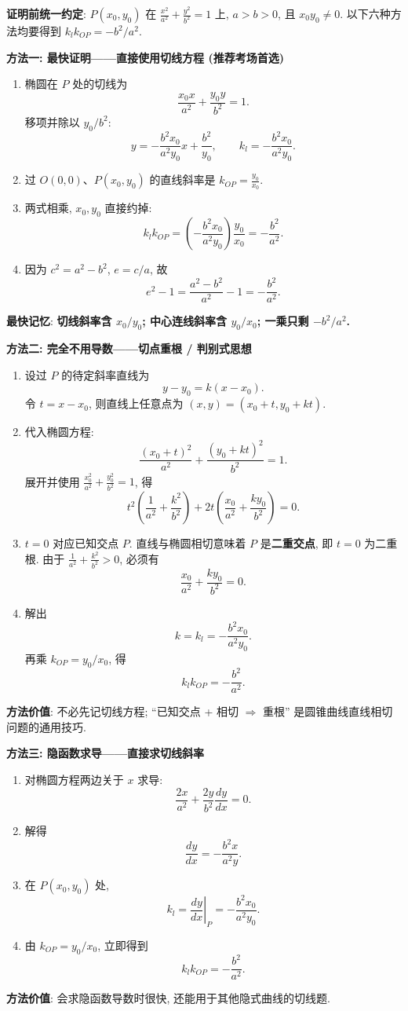 \begin{proofbox}
\textbf{证明前统一约定}: $P(x_0,y_0)$ 在
$\frac{x^2}{a^2}+\frac{y^2}{b^2}=1$ 上, $a>b>0$, 且 $x_0y_0\ne0$.
以下六种方法均要得到 $k_lk_{OP}=-b^2/a^2$.

\textbf{方法一: 最快证明——直接使用切线方程 (推荐考场首选)}

\begin{enumerate}
  \item 椭圆在 $P$ 处的切线为
  \[
  \frac{x_0x}{a^2}+\frac{y_0y}{b^2}=1.
  \]
  移项并除以 $y_0/b^2$:
  \[
  y=-\frac{b^2x_0}{a^2y_0}x+\frac{b^2}{y_0},
  \qquad k_l=-\frac{b^2x_0}{a^2y_0}.
  \]
  \item 过 $O(0,0)$、$P(x_0,y_0)$ 的直线斜率是
  $k_{OP}=\frac{y_0}{x_0}$.
  \item 两式相乘, $x_0,y_0$ 直接约掉:
  \[
  \boxed{k_lk_{OP}=
  \left(-\frac{b^2x_0}{a^2y_0}\right)
  \frac{y_0}{x_0}=-\frac{b^2}{a^2}.}
  \]
  \item 因为 $c^2=a^2-b^2$, $e=c/a$, 故
  \[
  e^2-1=\frac{a^2-b^2}{a^2}-1=-\frac{b^2}{a^2}.
  \]
\end{enumerate}
\textbf{最快记忆}: \textbf{切线斜率含 $x_0/y_0$; 中心连线斜率含 $y_0/x_0$;
一乘只剩 $-b^2/a^2$.}

\textbf{方法二: 完全不用导数——切点重根 / 判别式思想}

\begin{enumerate}
  \item 设过 $P$ 的待定斜率直线为
  \[
  y-y_0=k(x-x_0).
  \]
  令 $t=x-x_0$, 则直线上任意点为
  $(x,y)=(x_0+t,y_0+kt)$.
  \item 代入椭圆方程:
  \[
  \frac{(x_0+t)^2}{a^2}+
  \frac{(y_0+kt)^2}{b^2}=1.
  \]
  展开并使用 $\frac{x_0^2}{a^2}+\frac{y_0^2}{b^2}=1$, 得
  \[
  t^2\left(\frac1{a^2}+\frac{k^2}{b^2}\right)
  +2t\left(\frac{x_0}{a^2}+\frac{ky_0}{b^2}\right)=0.
  \]
  \item $t=0$ 对应已知交点 $P$. 直线与椭圆相切意味着
  $P$ 是\textbf{二重交点}, 即 $t=0$ 为二重根.
  由于 $\frac1{a^2}+\frac{k^2}{b^2}>0$, 必须有
  \[
  \frac{x_0}{a^2}+\frac{ky_0}{b^2}=0.
  \]
  \item 解出
  \[
  k=k_l=-\frac{b^2x_0}{a^2y_0}.
  \]
  再乘 $k_{OP}=y_0/x_0$, 得
  \[
  \boxed{k_lk_{OP}=-\frac{b^2}{a^2}.}
  \]
\end{enumerate}
\textbf{方法价值}: 不必先记切线方程; “已知交点 + 相切 $\Rightarrow$ 重根”
是圆锥曲线直线相切问题的通用技巧.

\textbf{方法三: 隐函数求导——直接求切线斜率}

\begin{enumerate}
  \item 对椭圆方程两边关于 $x$ 求导:
  \[
  \frac{2x}{a^2}+\frac{2y}{b^2}\frac{dy}{dx}=0.
  \]
  \item 解得
  \[
  \frac{dy}{dx}=-\frac{b^2x}{a^2y}.
  \]
  \item 在 $P(x_0,y_0)$ 处,
  \[
  k_l=\left.\frac{dy}{dx}\right|_P
  =-\frac{b^2x_0}{a^2y_0}.
  \]
  \item 由 $k_{OP}=y_0/x_0$, 立即得到
  \[
  \boxed{k_lk_{OP}=-\frac{b^2}{a^2}.}
  \]
\end{enumerate}
\textbf{方法价值}: 会求隐函数导数时很快, 还能用于其他隐式曲线的切线题.


\end{proofbox}
